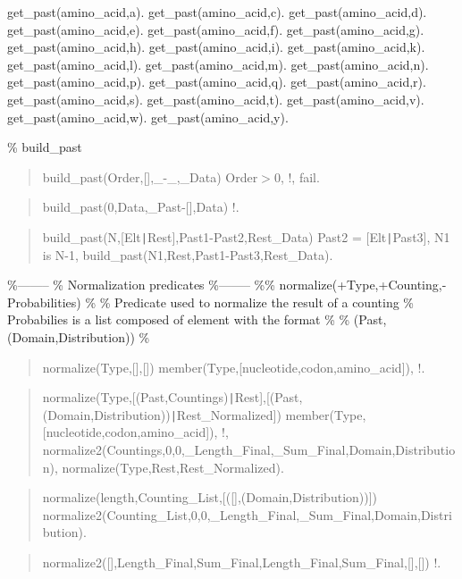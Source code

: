 get_past(amino_acid,a).
get_past(amino_acid,c).
get_past(amino_acid,d).
get_past(amino_acid,e).
get_past(amino_acid,f).
get_past(amino_acid,g).
get_past(amino_acid,h).
get_past(amino_acid,i).
get_past(amino_acid,k).
get_past(amino_acid,l).
get_past(amino_acid,m).
get_past(amino_acid,n).
get_past(amino_acid,p).
get_past(amino_acid,q).
get_past(amino_acid,r).
get_past(amino_acid,s).
get_past(amino_acid,t).
get_past(amino_acid,v).
get_past(amino_acid,w).
get_past(amino_acid,y).

\% build_past

\begin{quote}
build_past(Order,[],_-_,_Data) \Sneck{}
Order$>$0,
!,
fail.
\end{quote}

\begin{quote}
build_past(0,Data,_Past-[],Data) \Sneck{}
!.
\end{quote}

\begin{quote}
build_past(N,[Elt{\tt\string|}Rest],Past1-Past2,Rest_Data) \Sneck{}
Past2 = [Elt{\tt\string|}Past3],
N1 is N-1,
build_past(N1,Rest,Past1-Past3,Rest_Data).
\end{quote}

\%--------
\% Normalization predicates
\%--------
\%\% normalize(+Type,+Counting,-Probabilities)
\%
\% Predicate used to normalize the result of a counting
\% Probabilies is a list composed of element with the format
\% \Sequal{}
\% (Past,(Domain,Distribution))
\% \Sequal{}

\begin{quote}
normalize(Type,[],[]) \Sneck{}
member(Type,[nucleotide,codon,amino_acid]),
!.
\end{quote}

\begin{quote}
normalize(Type,[(Past,Countings){\tt\string|}Rest],[(Past,(Domain,Distribution)){\tt\string|}Rest_Normalized]) \Sneck{}
member(Type,[nucleotide,codon,amino_acid]),
!,
normalize2(Countings,0,0,_Length_Final,_Sum_Final,Domain,Distribution),
normalize(Type,Rest,Rest_Normalized).
\end{quote}

\begin{quote}
normalize(length,Counting_List,[([],(Domain,Distribution))]) \Sneck{}
normalize2(Counting_List,0,0,_Length_Final,_Sum_Final,Domain,Distribution).
\end{quote}

\begin{quote}
normalize2([],Length_Final,Sum_Final,Length_Final,Sum_Final,[],[]) \Sneck{}
!.
\end{quote}

